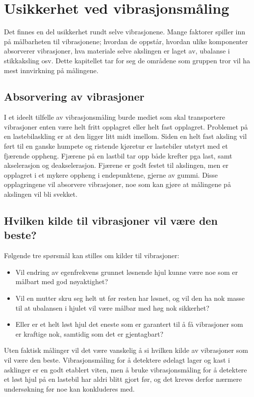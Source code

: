 \section{Usikkerhet ved vibrasjonsmåling}
Det finnes en del usikkerhet rundt selve vibrasjonene. Mange faktorer spiller inn på målbarheten til vibrasjonene; 
hvordan de oppstår, hvordan ulike komponenter absorverer vibrasjoner, hva materiale selve akslingen er laget av, 
ubalanse i stikkaksling osv. Dette kapitellet tar for seg de områdene som gruppen tror vil ha mest innvirkning på målingene.
\subsection{Absorvering av vibrasjoner}
I et ideelt tilfelle av vibrasjonsmåling burde mediet som skal transportere vibrasjoner 
enten være helt fritt opplagret eller helt fast opplagret. Problemet på en lastebilaskling 
er at den ligger litt midt imellom. Siden en helt fast aksling vil ført til en ganske humpete 
og ristende kjøretur er lastebiler utstyrt med et fjærende oppheng. Fjærene på en lastbil
 tar opp både krefter pga last, samt akselerasjon og deakselerasjon. Fjærene er godt 
festet til akslingen, men er opplagret i et mykere oppheng i endepunktene, gjerne av gummi. 
Disse opplagringene vil absorvere vibrasjoner, noe som kan gjøre at målingene på akslingen vil bli svekket.

\subsection{Hvilken kilde til vibrasjoner vil være den beste?}
Følgende tre spørsmål kan stilles om kilder til vibrasjoner:
\begin{itemize}
	\item Vil endring av egenfrekvens grunnet løsnende hjul kunne være noe som er 
målbart med god nøyaktighet?
	\item Vil en mutter skru seg helt ut før resten har
 løsnet, og vil den ha nok masse til at ubalansen i hjulet vil være målbar med 
høg nok sikkerhet? 
	\item Eller er et helt løst hjul det eneste som er garantert til å få 
vibrasjoner som er kraftige nok, samtidig som det er gjentagbart?
\end{itemize}
Uten faktisk målinger vil det være vanskelig å si hvilken kilde av vibrasjoner 
som vil være den beste. Vibrasjonsmåling for å detektere ødelagt lager og 
kast i asklinger er en godt etablert viten, men å bruke vibrasjonsmåling for 
å detektere et løst hjul på en lastebil har aldri blitt gjort før, og det kreves 
derfor nærmere undersøkning før noe kan konkluderes med. 
